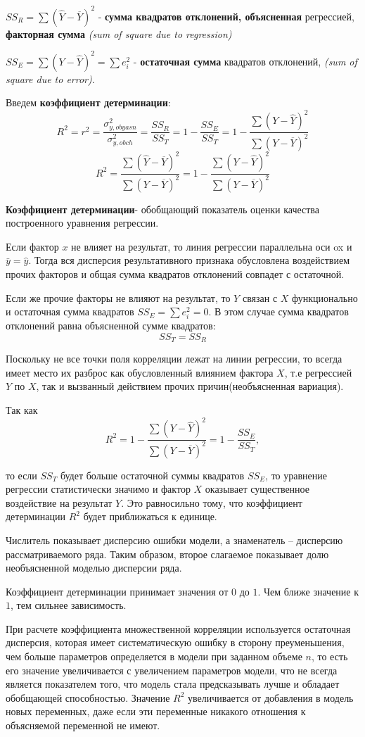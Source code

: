 \documentclass[aps,%
12pt,%
final,%
oneside,
onecolumn,%
musixtex, %
superscriptaddress,%
centertags]{article} %
\theoremstyle{plain}
\theoremstyle{definition}
\theoremstyle{remark}
\begin{document}
$SS_R = \sum (\widehat{Y}-\overline{Y})^2 $ - \textbf{сумма квадратов отклонений, объясненная} регрессией, \textbf{факторная сумма} \textit{(sum of square due to regression)}

$SS_E = \sum (Y - \widehat{Y})^2  = \sum e_i^2 $ - \textbf{остаточная сумма} квадратов отклонений,
\textit{(sum of square due to error)}.

Введем \textbf{коэффициент детерминации}:
$$ R^2 = r^2 = \frac{\sigma_{y,obyasn}^2}{\sigma_{y,obch}^2} = \frac{SS_R}{SS_T} = 1 - \frac{SS_E}{SS_T} = 1 - \frac{\sum (Y - \widehat{Y})^2}{\sum (Y - \overline{Y})^2} $$
$$ R^2 = \frac{\sum (\widehat{Y}-\overline{Y})^2}{\sum (Y - \overline{Y})^2} = 1 - \frac{\sum (Y - \hat{Y})^2}{\sum (Y - \overline{Y})^2} $$

\textbf{Коэффициент детерминации}- обобщающий показатель оценки качества построенного уравнения регрессии.

Если фактор $x$ не влияет на результат, то линия регрессии параллельна оси ox  и $\bar{y} = \hat{y}$. Тогда вся дисперсия результативного признака обусловлена воздействием прочих факторов и общая сумма квадратов отклонений совпадет с остаточной.

Если же прочие факторы не влияют на результат, то $Y$ связан с $X$ функционально и остаточная сумма квадратов $SS_E = \sum e_i^2 = 0$. В этом случае сумма квадратов отклонений равна объясненной сумме квадратов: $$SS_T = SS_R$$

Поскольку не все точки поля корреляции лежат на линии регрессии, то всегда имеет место их разброс как обусловленный влиянием фактора $X$, т.е регрессией $Y$ по $X$, так и вызванный действием прочих причин(необъясненная вариация). 

Так как  $$ R^2 = 1 - \frac{\sum (Y - \widehat{Y})^2}{\sum (Y - \overline{Y})^2}  = 1 - \frac{SS_E}{SS_T},$$ 

то если $SS_T$ будет больше остаточной суммы квадратов $SS_E$, то уравнение регрессии статистически значимо и фактор $X$ оказывает существенное воздействие на результат $Y$. Это равносильно тому, что коэффициент детерминации $R^2$ будет приближаться к единице.

Числитель показывает дисперсию ошибки модели, а знаменатель – дисперсию рассматриваемого ряда. Таким образом, второе слагаемое показывает долю необъясненной моделью дисперсии ряда. 

Коэффициент детерминации принимает значения от $0$ до $1$. Чем ближе значение к $1$, тем
сильнее зависимость.

При расчете коэффициента множественной корреляции используется остаточная дисперсия, которая имеет систематическую ошибку в сторону преуменьшения, чем больше параметров определяется в модели при заданном объеме $n$, то есть его значение увеличивается с увеличением параметров модели, что не всегда является показателем того, что модель стала предсказывать лучше и обладает обобщающей способностью. Значение $R^2$ увеличивается от добавления в модель новых переменных, даже если эти переменные никакого отношения к объясняемой переменной не имеют. 
\end{document}
